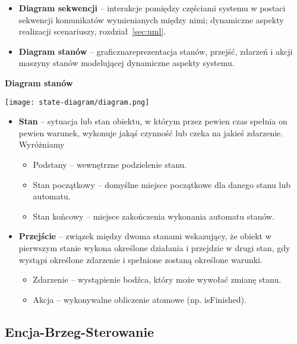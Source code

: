 \documentclass[main.tex]{subfiles}
\begin{document}
    \begin{itemize}
        \item \textbf{Diagram sekwencji} -- interakcje pomiędzy częściami systemu w postaci sekwencji
        komunikatów wymienianych między nimi; dynamiczne aspekty realizacji scenariuszy, rozdział~\ref{sec:uml}.
        \item \textbf{Diagram stanów} -- graficznareprezentacja stanów, przejść, zdarzeń i akcji maszyny stanów
        modelującej dynamiczne aspekty systemu.
    \end{itemize}

    \textbf{Diagram stanów}

    \begin{center}
        \texttt{[image: state-diagram/diagram.png]}
    \end{center}


    \begin{itemize}
        \item \textbf{Stan} -- sytuacja lub stan obiektu, w którym przez pewien czas spełnia on pewien warunek,
        wykonuje jakąś czynność lub czeka na jakieś zdarzenie. Wyróżniamy

        \begin{itemize}[noitemsep]
            \item Podstany -- wewnętrzne podzielenie stanu.
            \item Stan początkowy -- domyślne miejsce początkowe dla danego stanu lub automatu.
            \item Stan końcowy -- miejsce zakończenia wykonania automatu stanów.
        \end{itemize}

        \item \textbf{Przejście} -- związek między dwoma stanami wskazujący, że obiekt w pierwszym stanie wykona
        określone działania i przejdzie w drugi stan, gdy wystąpi określone zdarzenie i spełnione zostaną
        określone warunki.

        \begin{itemize}[noitemsep]
            \item Zdarzenie -- wystąpienie bodźca, który może wywołać zmianę stanu.
            \item Akcja -- wykonywalne obliczenie atomowe (np. isFinished).
        \end{itemize}
    \end{itemize}


    \subsection{Encja-Brzeg-Sterowanie}
\end{document}
